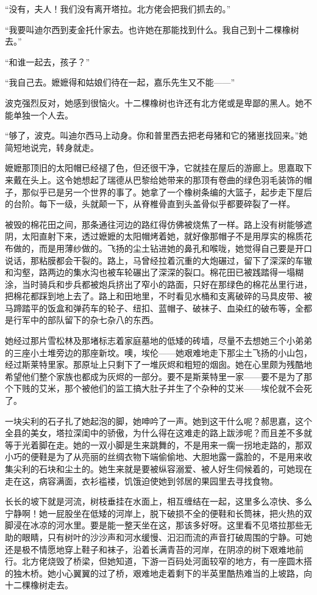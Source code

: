 \par “没有，夫人！我们没有离开塔拉。北方佬会把我们抓去的。”
\par “我要叫迪尔西到麦金托什家去。也许她在那能找到什么。我自己到十二棵橡树去。”
\par “和谁一起去，孩子？”
\par “我自己去。嬷嬷得和姑娘们待在一起，嘉乐先生又不能——”
\par 波克强烈反对，她感到很恼火。十二棵橡树也许还有北方佬或是卑鄙的黑人。她不能单独一个人去。
\par “够了，波克。叫迪尔西马上动身。你和普里西去把老母猪和它的猪崽找回来。”她简短地说完，转身就走。
\par 嬷嬷那顶旧的太阳帽已经褪了色，但还很干净，它就挂在屋后的游廊上。思嘉取下来戴在头上。这令她想起了瑞德从巴黎给她带来的那顶有卷曲的绿色羽毛装饰的帽子，那似乎已是另一个世界的事了。她拿了一个橡树条编的大篮子，起步走下屋后的台阶。每下一级，头就颠一下，从脊椎骨直到头盖骨似乎都要碎裂了一样。
\par 被毁的棉花田之间，那条通往河边的路红得仿佛被烧焦了一样。路上没有树能够遮阴，太阳直射下来，透过嬷嬷的太阳帽烤着她，就好像那帽子不是用厚实的棉质花布做的，而是用薄纱做的。飞扬的尘土钻进她的鼻孔和喉咙，她觉得自己要是开口说话，那粘膜都会干裂的。路上，马曾经拉着沉重的大炮碾过，留下了深深的车辙和沟壑，路两边的集水沟也被车轮碾出了深深的裂口。棉花田已被践踏得一塌糊涂，当时骑兵和步兵都被炮兵挤出了窄小的路面，只好在那绿色的棉花丛里行进，把棉花都踩到地上去了。路上和田地里，不时看见水桶和支离破碎的马具皮带、被马蹄踏平的饭盒和弹药车的轮子、纽扣、蓝帽子、破袜子、血染红的破布等，全都是行军中的部队留下的杂七杂八的东西。
\par 她经过那片雪松林及那堵标志着家庭墓地的低矮的砖墙，尽量不去想她三个小弟弟的三座小土堆旁边的那座新坟。噢，埃伦——她艰难地走下那尘土飞扬的小山包，经过斯莱特里家。那原址上只剩下了一堆灰烬和粗短的烟囱。她在心里颇为残酷地希望他们整个家族也都成为灰烬的一部分。要不是斯莱特里一家——要不是为了那个下贱的艾米，那个被他们的监工搞大肚子并生了个杂种的艾米——埃伦就不会死了。
\par 一块尖利的石子扎了她起泡的脚，她呻吟了一声。她到这干什么呢？郝思嘉，这个全县的美女，塔拉深闺中的骄傲，为什么得在这难走的路上跋涉呢？而且差不多就等于光着脚在走。她的一双小脚是生来跳舞的，不是用来一瘸一拐地走路的，那双小巧的便鞋是为了从亮丽的丝绸衣物下端偷偷地、大胆地露一露脸的，不是用来收集尖利的石块和尘土的。她生来就是要被纵容溺爱、被人好生伺候着的，可她现在走在这，病容满面，衣衫褴褛，饥饿迫使她到邻居的果园里去寻找食物。
\par 长长的坡下就是河流，树枝垂挂在水面上，相互缠结在一起，这里多么凉快、多么宁静啊！她一屁股坐在低矮的河岸上，脱下破损不全的便鞋和长筒袜，把火热的双脚浸在冰凉的河水里。要是能一整天坐在这，那该多好呀。这里看不见塔拉那些无助的眼睛，只有树叶的沙沙声和河水缓慢、汩汩而流的声音打破周围的宁静。可她还是极不情愿地穿上鞋子和袜子，沿着长满青苔的河岸，在阴凉的树下艰难地前行。北方佬烧毁了桥梁，但她知道，下游一百码处河面较窄的地方，有一座圆木搭的独木桥。她小心翼翼的过了桥，艰难地走着剩下的半英里酷热难当的上坡路，向十二棵橡树走去。
